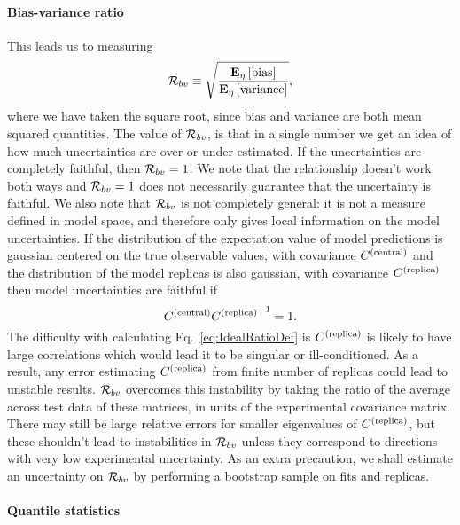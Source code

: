 \paragraph{Bias-variance ratio}

This leads us to measuring
\begin{equation}\label{eq:RatioDef}
    \mathcal{R}_{bv} \equiv \sqrt{\frac{\mathbf{E}_{\eta}\left[ {\rm bias} \right]}{\mathbf{E}_{\eta}\left[ {\rm variance} \right]}},
\end{equation}
where we have taken the square root, since bias and variance are both mean
squared quantities. The value of $\mathcal{R}_{bv}$, is that in a single
number we get an idea of how much uncertainties are over or under estimated.
If the uncertainties are completely faithful, then $\mathcal{R}_{bv} = 1$. We
note that the relationship doesn't work both ways and $\mathcal{R}_{bv} = 1$ does
not necessarily guarantee that the uncertainty is faithful. We also note
that $\mathcal{R}_{bv}$ is not completely general: it is not a measure defined in
model space, and therefore only gives local information on the model
uncertainties. If the distribution of the expectation value of model predictions
is gaussian centered on the true observable values, with covariance $C^{(\rm central)}$
and the distribution of the model replicas is also gaussian, with covariance
$C^{(\rm replica)}$ then model uncertainties are faithful if
\begin{equation}\label{eq:IdealRatioDef}
    C^{(\rm central)} {C^{(\rm replica)}}^{-1} = 1.
\end{equation}
The difficulty with calculating Eq.~\ref{eq:IdealRatioDef} is $C^{(\rm replica)}$ is likely
to have large correlations which would lead it to be singular or ill-conditioned.
As a result, any
error estimating $C^{(\rm replica)}$ from finite number of replicas could lead to
unstable results. $\mathcal{R}_{bv}$ overcomes this instability by taking the ratio
of the average across test data of these matrices, in units of the experimental
covariance matrix. There may still be large relative errors for smaller
eigenvalues of $C^{(\rm replica)}$, but these shouldn't lead to instabilities in
$\mathcal{R}_{bv}$ unless they correspond to directions with very low experimental
uncertainty. As an extra precaution, we shall estimate an uncertainty on
$\mathcal{R}_{bv}$ by performing a bootstrap sample on fits and replicas.

\paragraph{Quantile statistics}

